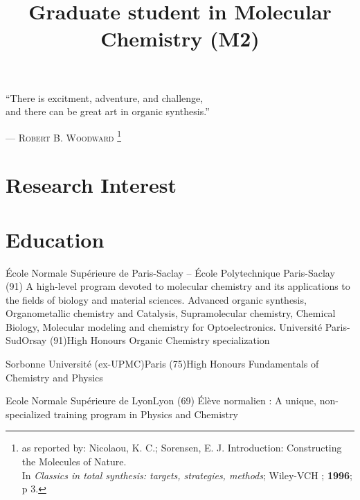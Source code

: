 \documentclass[11pt,a4paper,sans]{moderncv}
\title{Graduate student in Molecular Chemistry (M2)}
\begin{document}
\makecvtitle

{
    \vspace{-5mm}
    \centering
    \color{quote}
    \rmfamily
    ``There is excitment, adventure, and challenge,\\
    and there can be great art in organic synthesis.''\\
}

\begin{flushright}
    {\color{author}
    {---}  \textsc{Robert B. Woodward}
    \footnote{as reported by: Nicolaou, K. C.; Sorensen, E. J. Introduction: Constructing the Molecules of Nature. \\
    In \textit{Classics in total synthesis: targets, strategies, methods}; Wiley-VCH ; \textbf{1996}; p 3.
}}
\end{flushright}
%
\section{Research Interest}
%
%
\section{Education}
%
{{\newline}École Normale Supérieure de Paris-Saclay -- École Polytechnique}%
{Paris-Saclay (91)}{}%
{A high-level program devoted to molecular chemistry and its applications %
to the fields of biology and material sciences. \newline
Advanced organic synthesis, Organometallic chemistry and Catalysis, %
Supramolecular chemistry, Chemical Biology, %
Molecular modeling and chemistry for Optoelectronics.%
}
%
\vspace{5mm}
%
%
{Université Paris-Sud}{Orsay (91)}{High Honours}%
{Organic Chemistry specialization}

%
{Sorbonne Université (ex-UPMC)}{Paris (75)}{High Honours}%
{Fundamentals of Chemistry and Physics}

%
{Ecole Normale Supérieure de Lyon}{Lyon (69)}{}%
{Élève normalien : A unique, non-specialized training program in Physics and Chemistry}
\end{document}
